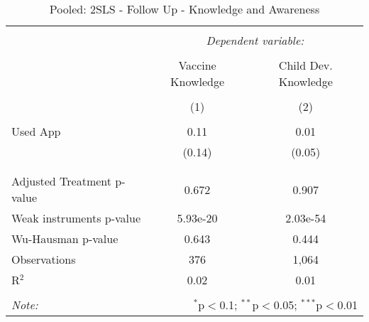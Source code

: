 
\begin{table}[!htbp] \centering 
  \caption{Pooled: 2SLS - Follow Up - Knowledge and Awareness} 
  \label{tbl:Pooled: 2SLS - Follow Up - Knowledge and Awareness} 
\begin{tabular}{@{\extracolsep{5pt}}lcc} 
\\[-1.8ex]\hline 
\hline \\[-1.8ex] 
 & \multicolumn{2}{c}{\textit{Dependent variable:}} \\ 
\cline{2-3} 
\\[-1.8ex] & Vaccine Knowledge & Child Dev. Knowledge \\ 
\\[-1.8ex] & (1) & (2)\\ 
\hline \\[-1.8ex] 
 Used App & 0.11 & 0.01 \\ 
  & (0.14) & (0.05) \\ 
  & & \\ 
\hline \\[-1.8ex] 
Adjusted Treatment p-value & 0.672 & 0.907 \\ 
Weak instruments p-value & 5.93e-20 & 2.03e-54 \\ 
Wu-Hausman p-value & 0.643 & 0.444 \\ 
Observations & 376 & 1,064 \\ 
R$^{2}$ & 0.02 & 0.01 \\ 
\hline 
\hline \\[-1.8ex] 
\textit{Note:}  & \multicolumn{2}{r}{$^{*}$p$<$0.1; $^{**}$p$<$0.05; $^{***}$p$<$0.01} \\ 
\end{tabular} 
\end{table} 
